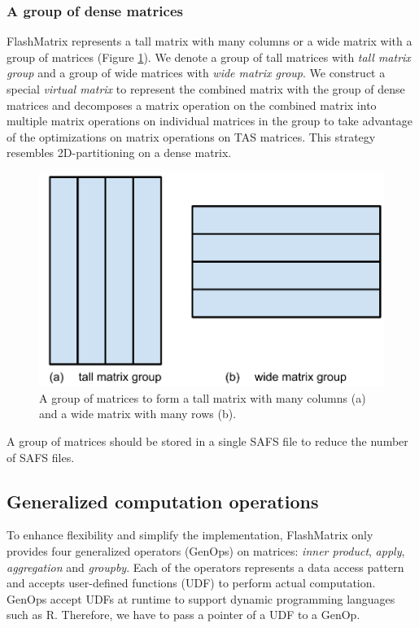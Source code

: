 \subsubsection{A group of dense matrices} \label{sec:mat_group}
FlashMatrix represents a tall matrix with many columns or a wide matrix with
a group of matrices (Figure \ref{fig:mat_group}). We denote a group of tall
matrices with \textit{tall matrix group} and a group of wide matrices with
\textit{wide matrix group}. We construct
a special \textit{virtual matrix} to represent the combined matrix with
the group of dense matrices and decomposes a matrix operation on the combined
matrix into multiple matrix operations on individual matrices in the group to
take advantage of the optimizations on matrix operations on TAS matrices.
This strategy resembles 2D-partitioning on a dense matrix.

\begin{figure}
	\centering
	\includegraphics[scale=0.5]{./matrix_group.pdf}
	\caption{A group of matrices to form a tall matrix with many columns (a)
	and a wide matrix with many rows (b).}
	\label{fig:mat_group}
\end{figure}

A group of matrices should be stored in a single SAFS file to reduce the number
of SAFS files.


\subsection{Generalized computation operations} \label{sec:genop}
To enhance flexibility and simplify the implementation, FlashMatrix only
provides four generalized operators (GenOps) on matrices: \textit{inner product},
\textit{apply}, \textit{aggregation} and \textit{groupby}. Each of the operators
represents a data access pattern and accepts user-defined functions (UDF) to
perform actual computation. GenOps accept UDFs
at runtime to support dynamic programming languages such as R. Therefore, we
have to pass a pointer of a UDF to a GenOp.

